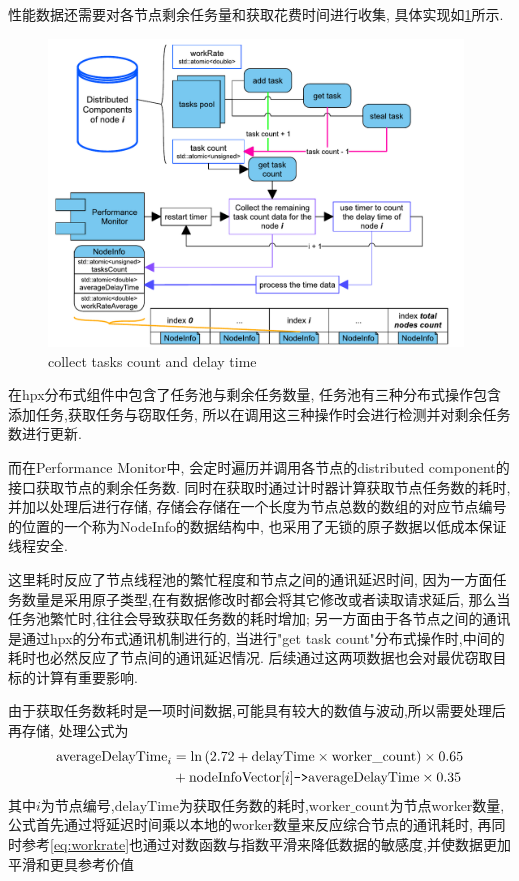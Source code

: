 \documentclass{mproj}
\begin{document}
性能数据还需要对各节点剩余任务量和获取花费时间进行收集,
具体实现如\cref{fig:tasks_detection}所示.

\begin{figure}[h]
    \centering %
    \includegraphics[width=0.98\textwidth]{images/tasks_detection.pdf} %
    \caption{collect tasks count and delay time} %
    \label{fig:tasks_detection} %
\end{figure}
\FloatBarrier

在hpx分布式组件中包含了任务池与剩余任务数量,
任务池有三种分布式操作包含添加任务,获取任务与窃取任务,
所以在调用这三种操作时会进行检测并对剩余任务数进行更新.

而在Performance Monitor中,
会定时遍历并调用各节点的distributed component的接口获取节点的剩余任务数.
同时在获取时通过计时器计算获取节点任务数的耗时,并加以处理后进行存储,
存储会存储在一个长度为节点总数的数组的对应节点编号的位置的一个称为NodeInfo的数据结构中,
也采用了无锁的原子数据以低成本保证线程安全.

这里耗时反应了节点线程池的繁忙程度和节点之间的通讯延迟时间,
因为一方面任务数量是采用原子类型,在有数据修改时都会将其它修改或者读取请求延后,
那么当任务池繁忙时,往往会导致获取任务数的耗时增加;
另一方面由于各节点之间的通讯是通过hpx的分布式通讯机制进行的,
当进行"get task count"分布式操作时,中间的耗时也必然反应了节点间的通讯延迟情况.
后续通过这两项数据也会对最优窃取目标的计算有重要影响.

由于获取任务数耗时是一项时间数据,可能具有较大的数值与波动,所以需要处理后再存储,
处理公式为
\begin{align}
    \text{averageDelayTime}_i & = \ln\left(2.72 + \text{delayTime} \times \text{worker\_count}\right) \times 0.65 \notag               \\
                              & + \text{nodeInfoVector}[i]\texttt{->}\text{averageDelayTime} \times 0.35   \label{eq:averageDelayTime}
\end{align}
其中$i$为节点编号,$\text{delayTime}$为获取任务数的耗时,$\text{worker\_count}$为节点worker数量,
公式首先通过将延迟时间乘以本地的worker数量来反应综合节点的通讯耗时,
再同时参考\cref{eq:workrate}也通过对数函数与指数平滑来降低数据的敏感度,并使数据更加平滑和更具参考价值
\end{document}
